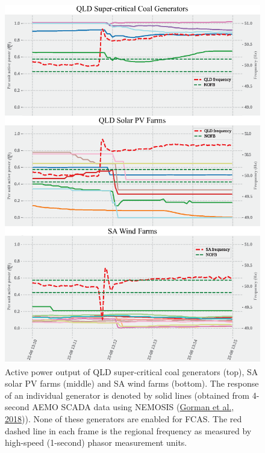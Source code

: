 \documentclass[12pt,a4paper,]{report}
\begin{document}
\begin{figure}
\hypertarget{fig:plant_responses}{%
\centering
\includegraphics{source/figures/all_responses_25082018.eps}
\caption[Response of different generation technologies to power system
events on the 25th of August, 2018]{Active power output of QLD
super-critical coal generators (top), SA solar PV farms (middle) and SA
wind farms (bottom). The response of an individual generator is denoted
by solid lines (obtained from 4-second AEMO SCADA data using NEMOSIS
(\protect\hyperlink{ref-gormanNEMOSISNEMOpen2018}{Gorman et al.,
2018})). None of these generators are enabled for FCAS. The red dashed
line in each frame is the regional frequency as measured by high-speed
(1-second) phasor measurement units.}\label{fig:plant_responses}
}
\end{figure}
\end{document}
